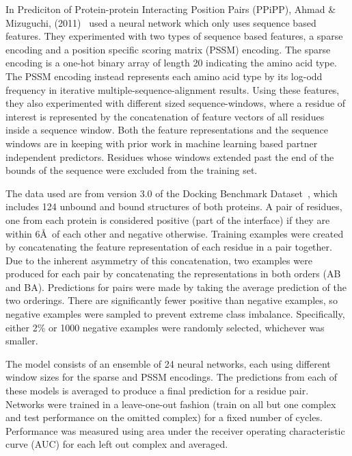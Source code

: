 In Prediciton of Protein-protein Interacting Position Pairs (PPiPP), Ahmad \& Mizuguchi, (2011)~\cite{ahmad2011} used a neural network which only uses sequence based features.
They experimented with two types of sequence based features, a sparse encoding and a position specific scoring matrix (PSSM) encoding.
The sparse encoding is a one-hot binary array of length 20 indicating the amino acid type.
The PSSM encoding instead represents each amino acid type by its log-odd frequency in iterative multiple-sequence-alignment results.
Using these features, they also experimented with different sized sequence-windows, where a residue of interest is represented by the concatenation of feature vectors of all residues inside a sequence window.
Both the feature representations and the sequence windows are in keeping with prior work in machine learning based partner independent predictors.
Residues whose windows extended past the end of the bounds of the sequence were excluded from the training set.

The data used are from version 3.0 of the Docking Benchmark Dataset~\cite{hwang2008}, which includes 124 unbound and bound structures of both proteins.
A pair of residues, one from each protein is considered positive (part of the interface) if they are within 6\AA~of each other and negative otherwise.
Training examples were created by concatenating the feature representation of each residue in a pair together.
Due to the inherent asymmetry of this concatenation, two examples were produced for each pair by concatenating the representations in both orders (AB and BA).
Predictions for pairs were made by taking the average prediction of the two orderings.
There are significantly fewer positive than negative examples, so negative examples were sampled to prevent extreme class imbalance.
Specifically, either 2\% or 1000 negative examples were randomly selected, whichever was smaller.

The model consists of an ensemble of 24 neural networks, each using different window sizes for the sparse and PSSM encodings.
The predictions from each of these models is averaged to produce a final prediction for a residue pair.
Networks were trained in a leave-one-out fashion (train on all but one complex and test performance on the omitted complex) for a fixed number of cycles.
Performance was measured using area under the receiver operating characteristic curve (AUC) for each left out complex and averaged.

